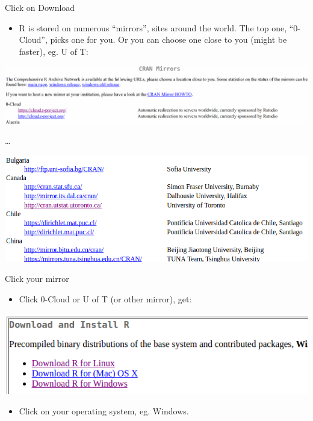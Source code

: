 \documentclass[ignorenonframetext,]{beamer}
\providecommand{\tightlist}{%
  \setlength{\itemsep}{0pt}\setlength{\parskip}{0pt}}
\begin{document}
\begin{frame}{Click on Download}
\protect\hypertarget{click-on-download}{}

\begin{itemize}
\tightlist
\item
  R is stored on numerous ``mirrors'', sites around the world. The top
  one, ``0-Cloud'', picks one for you. Or you can choose one close to
  you (might be faster), eg. U of T:
\end{itemize}

\includegraphics{Screenshot_2018-08-17_11-09-02.png}

\ldots{}

\includegraphics{r39.png}

\end{frame}

\begin{frame}{Click your mirror}
\protect\hypertarget{click-your-mirror}{}

\begin{itemize}
\tightlist
\item
  Click 0-Cloud or U of T (or other mirror), get:
\end{itemize}

\includegraphics{r32.png}

\begin{itemize}
\tightlist
\item
  Click on your operating system, eg. Windows.
\end{itemize}

\end{frame}
\end{document}
